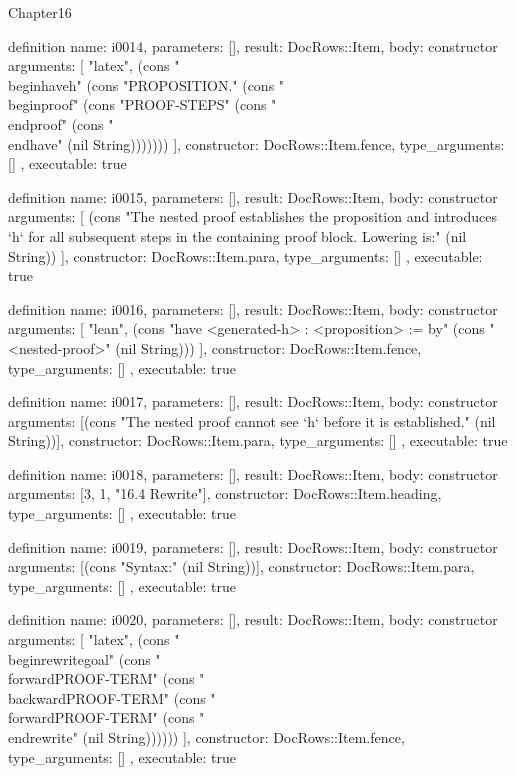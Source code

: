 \begin{lexlean}{Chapter16}
\begin{semanticmodule}
definition{
  name: i0014,
  parameters: [],
  result: DocRows::Item,
  body: constructor{
    arguments: [
      "latex",
      (cons "\\begin{have}{h}" (cons "PROPOSITION." (cons "\\begin{proof}" (cons "PROOF-STEPS" (cons "\\end{proof}" (cons "\\end{have}" (nil String)))))))
    ],
    constructor: DocRows::Item.fence,
    type_arguments: []
  },
  executable: true
}

definition{
  name: i0015,
  parameters: [],
  result: DocRows::Item,
  body: constructor{
    arguments: [
      (cons "The nested proof establishes the proposition and introduces `h` for all subsequent steps in the containing proof block. Lowering is:" (nil String))
    ],
    constructor: DocRows::Item.para,
    type_arguments: []
  },
  executable: true
}

definition{
  name: i0016,
  parameters: [],
  result: DocRows::Item,
  body: constructor{
    arguments: [
      "lean",
      (cons "have <generated-h> : <proposition> := by" (cons "  <nested-proof>" (nil String)))
    ],
    constructor: DocRows::Item.fence,
    type_arguments: []
  },
  executable: true
}

definition{
  name: i0017,
  parameters: [],
  result: DocRows::Item,
  body: constructor{
    arguments: [(cons "The nested proof cannot see `h` before it is established." (nil String))],
    constructor: DocRows::Item.para,
    type_arguments: []
  },
  executable: true
}

definition{
  name: i0018,
  parameters: [],
  result: DocRows::Item,
  body: constructor{
    arguments: [3, 1, "16.4 Rewrite"],
    constructor: DocRows::Item.heading,
    type_arguments: []
  },
  executable: true
}

definition{
  name: i0019,
  parameters: [],
  result: DocRows::Item,
  body: constructor{
    arguments: [(cons "Syntax:" (nil String))],
    constructor: DocRows::Item.para,
    type_arguments: []
  },
  executable: true
}

definition{
  name: i0020,
  parameters: [],
  result: DocRows::Item,
  body: constructor{
    arguments: [
      "latex",
      (cons "\\begin{rewrite}{goal}" (cons "\\forward{PROOF-TERM}" (cons "\\backward{PROOF-TERM}" (cons "\\forward{PROOF-TERM}" (cons "\\end{rewrite}" (nil String))))))
    ],
    constructor: DocRows::Item.fence,
    type_arguments: []
  },
  executable: true
}


\end{semanticmodule}
\end{lexlean}
